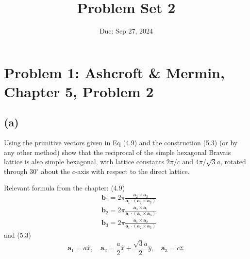 \documentclass[12pt]{article}
\title{Problem Set 2}
\author{}
\date{Due: Sep 27, 2024}
\begin{document}
\maketitle

\section{Problem 1: Ashcroft \& Mermin, Chapter 5, Problem 2}
\subsection{(a)}
 Using the primitive vectors given in Eq (4.9) and the construction (5.3) (or by any other method) show that the reciprocal of the simple hexagonal Bravais lattice is also simple hexagonal, with lattice constants $2 \pi / c$ and $4 \pi / \sqrt{3} a$, rotated through $30^{\circ}$ about the $c$-axis with respect to the direct lattice.

Relevant formula from the chapter:
(4.9)
$$
\begin{aligned}
& \mathbf{b}_1=2 \pi \frac{\mathbf{a}_2 \times \mathbf{a}_3}{\mathbf{a}_1 \cdot\left(\mathbf{a}_2 \times \mathbf{a}_3\right)} \\
& \mathbf{b}_2=2 \pi \frac{\mathbf{a}_3 \times \mathbf{a}_1}{\mathbf{a}_1 \cdot\left(\mathbf{a}_2 \times \mathbf{a}_3\right)} \\
& \mathbf{b}_3=2 \pi \frac{\mathbf{a}_1 \times \mathbf{a}_2}{\mathbf{a}_1 \cdot\left(\mathbf{a}_2 \times \mathbf{a}_3\right)}
\end{aligned}
$$
and (5.3)
$$
\mathbf{a}_1=a \hat{x}, \quad \mathbf{a}_2=\frac{a}{2} \hat{x}+\frac{\sqrt{3} a}{2} \hat{y}, \quad \mathbf{a}_3=c \hat{z} .
$$
\end{document}
